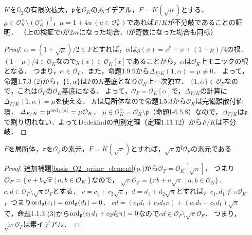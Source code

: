 \begin{screen}
  $K$を$\mathbb{Q}_2$の有限次拡大，$\mathfrak{p}$を$\mathcal{O}_K$の素イデアル，$F=K(\sqrt{\mu})$とする．
  $\mu\in\mathcal{O}_K^\times\setminus(\mathcal{O}_K^\times)^2$，$\mu=1+4u\ (u\in\mathcal{O}_K^\times)$であれば$F/K$が不分岐であることの証明．
  （上の検証で$l$が$2m$になった場合．$l$が奇数になった場合も同様）
\end{screen}
\begin{proof}
  $\alpha=(1+\sqrt{\mu})/2\in F$とすれば，$\alpha$は$g(x)=x^2-x+(1-\mu)/4$の根．
  $(1-\mu)/4\in\mathcal{O}_K$なので$g(x)\in\mathcal{O}_K[x]$であることから，$\alpha$は$\mathcal{O}_K$上モニックの根となる．
  つまり，$\alpha\in\mathcal{O}_F$．また，命題1.9.9から$\varDelta_{F/K}(1,\alpha)=\mu\neq 0$．
  よって，命題1.7.3 (2)から，$\{1,\alpha\}$は$F$の$K$基底となり$\mathcal{O}_K$上一次独立．
  $\{1,\alpha\}\in\mathcal{O}_F$なので，これは$\mathcal{O}_F$の$\mathcal{O}_K$基底になる．
  よって，$\mathcal{O}_F=\mathcal{O}_K[\alpha]$で，$\varDelta_{F/K}$の計算に$\varDelta_{F/K}(1,\alpha)=\mu$を使える．
  $K$は局所体なので命題1.5.3から$\mathcal{O}_K$は完備離散付値環．
  $\varDelta_{F/K}=\mathfrak{p}^{\operatorname{ord}_\mathfrak{p}(\mu)}=\mu\mathcal{O}_K$．
  $\mu\in\mathcal{O}_K^\times = \mathcal{O}_K \setminus \mathfrak{p}$（命題I-6.5.8）なので，$\varDelta_{F/K}$は$\mathfrak{p}$で割り切れない．よってDedekindの判別定理（定理1.11.12）から$F/K$は不分岐．
\end{proof}

\begin{screen}
  $F$を局所体，$\pi$を$\mathcal{O}_F$の素元，$F=K(\sqrt{\pi})$とすれば，$\sqrt{\pi}$が$\mathcal{O}_F$の素元である
\end{screen}
\begin{proof}
  追加補題\ref{basis_Q2_prime_element}(p.\pageref{basis_Q2_prime_element})から$\mathcal{O}_F=\mathcal{O}_K[\sqrt{\pi}]$，
  つまり$\mathcal{O}_F=\set{a+b\sqrt{\pi} | a,b\in\mathcal{O}_K}$なので，
  $\sqrt{\pi}\mathcal{O}_F=\{\pi b+a\sqrt{\pi}\mid a,b\in\mathcal{O}_K\}$．
  $c,d\in\mathcal{O}_F\setminus\sqrt{\pi}\mathcal{O}_F$とする．
  $c=c_1+c_2\sqrt{\pi}$，$d=d_1+d_2\sqrt{\pi}$とすれば，$c_1,d_1\not\in\pi\mathcal{O}_K$，つまり$\operatorname{ord}_\mathfrak{p}(c_1)=\operatorname{ord}_\mathfrak{p}(d_1)=0$．
  $cd=(c_1d_1+c_2d_2\pi)+(c_1d_2+c_2d_1)\sqrt{\pi}$で，命題1.1.3 (3)から$\operatorname{ord}_\mathfrak{p}(c_1d_1+c_2d_2\pi)=0$なので$cd\in\mathcal{O}_F\setminus\sqrt{\pi}\mathcal{O}_F$．
  つまり，$\sqrt{\pi}\mathcal{O}_F$は素イデアル．
\end{proof}

